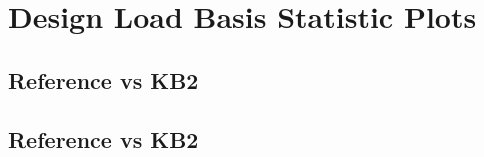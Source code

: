 \newpage
\chapter{Design Load Basis Statistic Plots}
\section{Reference vs KB2}
\label{app:baseline-vs-KB1}


\clearpage

\clearpage

\clearpage

\clearpage

\clearpage

\clearpage

\clearpage

\clearpage

\clearpage

\clearpage

\clearpage

\clearpage

\clearpage

\clearpage

\clearpage

\clearpage

\clearpage


\newpage
\section{Reference vs KB2}
\label{app:baseline-vs-KB2}


\clearpage

\clearpage

\clearpage

\clearpage

\clearpage

\clearpage

\clearpage

\clearpage

\clearpage

\clearpage

\clearpage

\clearpage

\clearpage

\clearpage

\clearpage

\clearpage

\clearpage

